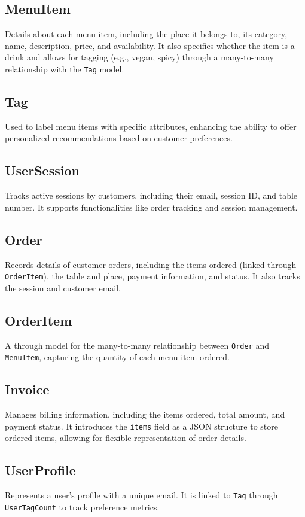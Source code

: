 \subsection{MenuItem}
Details about each menu item, including the place it belongs to, its category, name, description, price, and availability. It also specifies whether the item is a drink and allows for tagging (e.g., vegan, spicy) through a many-to-many relationship with the \texttt{Tag} model.

\subsection{Tag}
Used to label menu items with specific attributes, enhancing the ability to offer personalized recommendations based on customer preferences.

\subsection{UserSession}
Tracks active sessions by customers, including their email, session ID, and table number. It supports functionalities like order tracking and session management.

\subsection{Order}
Records details of customer orders, including the items ordered (linked through \texttt{OrderItem}), the table and place, payment information, and status. It also tracks the session and customer email.

\subsection{OrderItem}
A through model for the many-to-many relationship between \texttt{Order} and \texttt{MenuItem}, capturing the quantity of each menu item ordered.

\subsection{Invoice}
Manages billing information, including the items ordered, total amount, and payment status. It introduces the \texttt{items} field as a JSON structure to store ordered items, allowing for flexible representation of order details.

\subsection{UserProfile}
Represents a user's profile with a unique email. It is linked to \texttt{Tag} through \texttt{UserTagCount} to track preference metrics.

